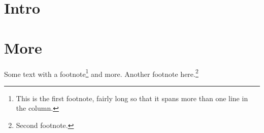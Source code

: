 \documentclass[twocolumn]{article}
\begin{document}
\section{Intro}
\lipsum[1-6]
\section{More}
Some text with a footnote\footnote{This is the first footnote, fairly long so that
it spans more than one line in the column.} and more.
\lipsum[7-9]
Another footnote here.\footnote{Second footnote.}
\lipsum[10-11]
\end{document}
